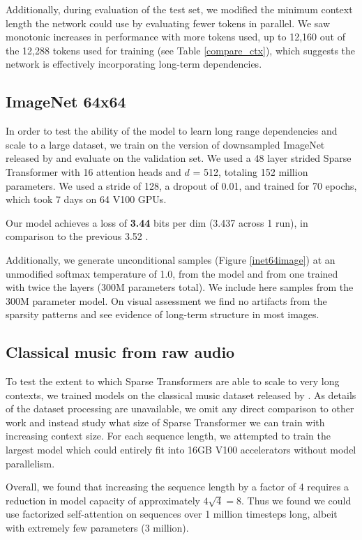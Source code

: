 \documentclass{article}
\begin{document}
Additionally, during evaluation of the test set, we modified the minimum context length the network could use by evaluating fewer tokens in parallel. We saw monotonic increases in performance with more tokens used, up to 12,160 out of the 12,288 tokens used for training (see Table \ref{compare_ctx}), which suggests the network is effectively incorporating long-term dependencies.

\subsection{ImageNet 64x64}

In order to test the ability of the model to learn long range dependencies and scale to a large dataset, we train on the version of downsampled ImageNet released by \cite{oord2016pixel} and evaluate on the validation set. We used a 48 layer strided Sparse Transformer with 16 attention heads and $d$ = 512, totaling 152 million parameters. We used a stride of 128, a dropout of 0.01, and trained for 70 epochs, which took 7 days on 64 V100 GPUs.

Our model achieves a loss of \textbf{3.44} bits per dim (3.437 across 1 run), in comparison to the previous 3.52 \cite{menick2018generating}. 

Additionally, we generate unconditional samples (Figure \ref{inet64image}) at an unmodified softmax temperature of 1.0, from the model and from one trained with twice the layers (300M parameters total). We include here samples from the 300M parameter model. On visual assessment we find no artifacts from the sparsity patterns and see evidence of long-term structure in most images. 

\subsection{Classical music from raw audio}

To test the extent to which Sparse Transformers are able to scale to very long contexts, we trained models on the classical music dataset released by \cite{dieleman2018challenge}. As details of the dataset processing are unavailable, we omit any direct comparison to other work and instead study what size of Sparse Transformer we can train with increasing context size. For each sequence length, we attempted to train the largest model which could entirely fit into 16GB V100 accelerators without model parallelism.

Overall, we found that increasing the sequence length by a factor of 4 requires a reduction in model capacity of approximately $4 \sqrt{4} = 8$. Thus we found we could use factorized self-attention on sequences over 1 million timesteps long, albeit with extremely few parameters (3 million).
\end{document}
